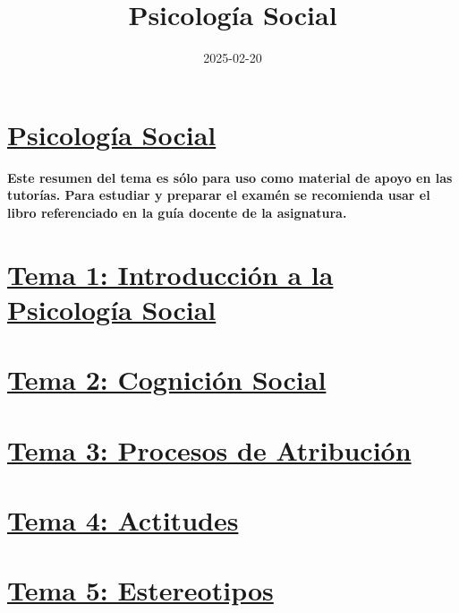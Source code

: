 \documentclass[
]{book}
\title{Psicología Social}
\author{}
\date{\vspace{-2.5em}2025-02-20}
\begin{document}
\maketitle

{
\setcounter{tocdepth}{1}
\tableofcontents
}
\chapter{\texorpdfstring{\href{https://dalarconrub.github.io/psicologia-social/}{Psicología Social}}{Psicología Social}}\label{psicologuxeda-social}

\textbf{Este resumen del tema es sólo para uso como material de apoyo en las tutorías. Para estudiar y preparar el examén se recomienda usar el libro referenciado en la guía docente de la asignatura.}

\chapter{\texorpdfstring{\href{https://dalarconrub.github.io/psicologia-social-tema-1/}{Tema 1: Introducción a la Psicología Social}}{Tema 1: Introducción a la Psicología Social}}\label{tema-1-introducciuxf3n-a-la-psicologuxeda-social}

\chapter{\texorpdfstring{\href{https://dalarconrub.github.io/psicologia-social-tema-2/}{Tema 2: Cognición Social}}{Tema 2: Cognición Social}}\label{tema-2-cogniciuxf3n-social}

\chapter{\texorpdfstring{\href{https://dalarconrub.github.io/psicologia-social-tema-3/}{Tema 3: Procesos de Atribución}}{Tema 3: Procesos de Atribución}}\label{tema-3-procesos-de-atribuciuxf3n}

\chapter{\texorpdfstring{\href{https://dalarconrub.github.io/psicologia-social-tema-4/}{Tema 4: Actitudes}}{Tema 4: Actitudes}}\label{tema-4-actitudes}

\chapter{\texorpdfstring{\href{https://dalarconrub.github.io/psicologia-social-tema-5/}{Tema 5: Estereotipos}}{Tema 5: Estereotipos}}\label{tema-5-estereotipos}
\end{document}
